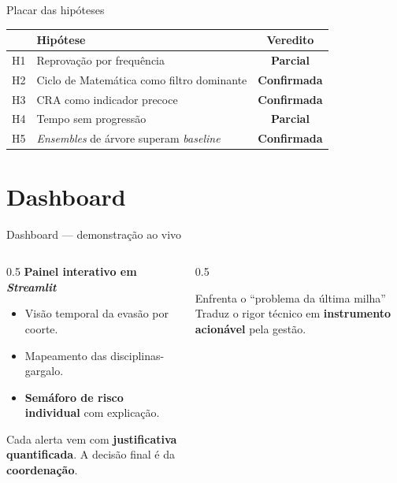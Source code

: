\documentclass[aspectratio=169,11pt,brazil]{beamer}
\begin{document}
\begin{frame}{Placar das hipóteses}
  \centering
  \begin{table}
    \renewcommand{\arraystretch}{1.3}
    \begin{tabular}{clc}
      \toprule
      & \textbf{Hipótese} & \textbf{Veredito} \\
      \midrule
      H1 & Reprovação por frequência & \color{orange}\textbf{Parcial} \\
      H2 & Ciclo de Matemática como filtro dominante & \color{ufvjmgreen}\textbf{Confirmada} \\
      H3 & CRA como indicador precoce & \color{ufvjmgreen}\textbf{Confirmada} \\
      H4 & Tempo sem progressão & \color{orange}\textbf{Parcial} \\
      H5 & \emph{Ensembles} de árvore superam \emph{baseline} & \color{ufvjmgreen}\textbf{Confirmada} \\
      \bottomrule
    \end{tabular}
  \end{table}
\end{frame}

\section{Dashboard}

\begin{frame}{Dashboard --- demonstração ao vivo}
  \begin{columns}[T]
    \begin{column}{0.5\textwidth}
      \textbf{Painel interativo em \emph{Streamlit}}
      \begin{itemize}
        \item Visão temporal da evasão por coorte.
        \item Mapeamento das disciplinas-gargalo.
        \item \textbf{Semáforo de risco individual} com explicação.
      \end{itemize}
      \medskip
      Cada alerta vem com \textbf{justificativa quantificada}. A decisão final é da \textbf{coordenação}.
    \end{column}
    \begin{column}{0.5\textwidth}
      \begin{block}{Enfrenta o ``problema da última milha''}
        Traduz o rigor técnico em \textbf{instrumento acionável} pela gestão.
      \end{block}
    \end{column}
  \end{columns}
\end{frame}
\end{document}
